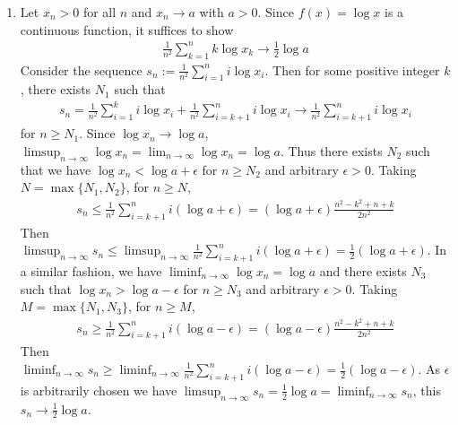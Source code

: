 \documentclass[a4paper,10pt]{article}
\theoremstyle{definition}
\begin{document}
\begin{enumerate}
\item Let $x_n >0$ for all $n$ and $x_n \to a$ with $a >0$. Since $f(x) = \log x$ is a continuous function, it suffices to show
\begin{align*}
\frac{1}{n^2}\sum_{k=1}^{n}k\log x_k \to \frac{1}{2}\log a
\end{align*}
Consider the sequence $s_n:=\frac{1}{n^2}\sum_{i=1}^{n}i\log x_i$. Then for some positive integer $k$, there exists $N_1$ such that 
\begin{align*}
s_n = \frac{1}{n^2}\sum_{i=1}^{k}i\log x_i+\frac{1}{n^2}\sum_{i=k+1}^{n}i\log x_i \to \frac{1}{n^2}\sum_{i=k+1}^{n}i\log x_i 
\end{align*}
for $n \geq N_1$. Since $\log x_n \to \log a$, $\limsup_{n\to \infty} \log x_n = \lim_{n\to \infty} \log x_n = \log a$. Thus there exists $N_2$ such that we have $\log x_n < \log a + \epsilon$ for $n \geq N_2$ and arbitrary $\epsilon >0$. Taking $N = \max\{N_1, N_2\}$, for $n \geq N$,
\begin{align*}
s_n \leq \frac{1}{n^2}\sum_{i=k+1}^{n}i(\log a + \epsilon) = (\log a + \epsilon)\frac{n^2-k^2+n+k}{2n^2}
\end{align*}
Then $\limsup_{n\to\infty}s_n \leq \limsup_{n\to\infty}\frac{1}{n^2}\sum_{i=k+1}^{n}i(\log a + \epsilon) = \frac{1}{2}(\log a + \epsilon)$. In a similar fashion, we have $\liminf_{n\to\infty}\log x_n = \log a$ and there exists $N_3$ such that $\log x_n > \log a - \epsilon$ for $n \geq N_3$ and arbitrary $\epsilon >0$. Taking $M =\max\{N_1,N_3\}$, for $n \geq M$,
\begin{align*}
s_n \geq \frac{1}{n^2}\sum_{i=k+1}^{n}i(\log a - \epsilon) = (\log a - \epsilon)\frac{n^2-k^2+n+k}{2n^2}
\end{align*}
Then $\liminf_{n\to\infty} s_n \geq \liminf_{n\to\infty}\frac{1}{n^2}\sum_{i=k+1}^{n}i(\log a - \epsilon) = \frac{1}{2}(\log a -\epsilon)$. As $\epsilon$ is arbitrarily chosen we have $\limsup_{n\to\infty} s_n=\frac{1}{2}\log a = \liminf_{n\to\infty}s_n$, this $s_n \to \frac{1}{2}\log a$.



\end{enumerate}
\end{document}

